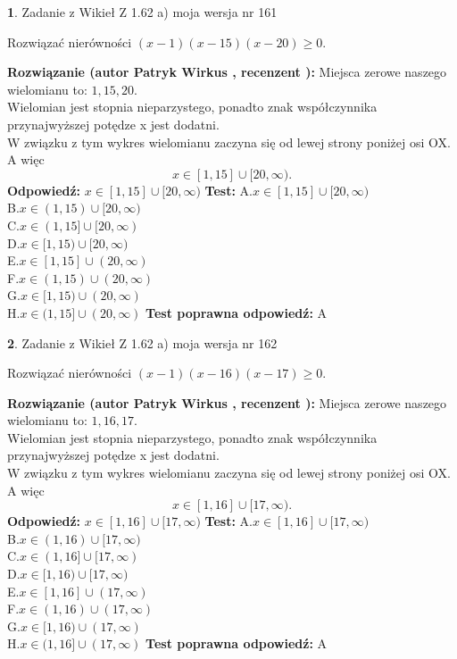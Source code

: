 \documentclass[12pt, a4paper]{article}
\theoremstyle{definition} %
\newtheorem{zad}{}
\newcommand{\zadStart}[1]{\begin{zad}#1\newline}
\newcommand{\zadStop}{\end{zad}}
\newcommand{\rozwStart}[2]{\noindent \textbf{Rozwiązanie (autor #1 , recenzent #2): }\newline}
\newcommand{\rozwStop}{\newline}
\newcommand{\odpStart}{\noindent \textbf{Odpowiedź:}\newline}
\newcommand{\odpStop}{\newline}
\newcommand{\testStart}{\noindent \textbf{Test:}\newline}
\newcommand{\testStop}{\newline}
\newcommand{\kluczStart}{\noindent \textbf{Test poprawna odpowiedź:}\newline}
\newcommand{\kluczStop}{\newline}
\begin{document}
\zadStart{Zadanie z Wikieł Z 1.62 a) moja wersja nr 161}

Rozwiązać nierówności $(x-1)(x-15)(x-20)\ge0$.
\zadStop
\rozwStart{Patryk Wirkus}{}
Miejsca zerowe naszego wielomianu to: $1, 15, 20$.\\
Wielomian jest stopnia nieparzystego, ponadto znak współczynnika przy\linebreak najwyższej potędze x jest dodatni.\\ W związku z tym wykres wielomianu zaczyna się od lewej strony poniżej osi OX. A więc $$x \in [1,15] \cup [20,\infty).$$
\rozwStop
\odpStart
$x \in [1,15] \cup [20,\infty)$
\odpStop
\testStart
A.$x \in [1,15] \cup [20,\infty)$\\
B.$x \in (1,15) \cup [20,\infty)$\\
C.$x \in (1,15] \cup [20,\infty)$\\
D.$x \in [1,15) \cup [20,\infty)$\\
E.$x \in [1,15] \cup (20,\infty)$\\
F.$x \in (1,15) \cup (20,\infty)$\\
G.$x \in [1,15) \cup (20,\infty)$\\
H.$x \in (1,15] \cup (20,\infty)$
\testStop
\kluczStart
A
\kluczStop



\zadStart{Zadanie z Wikieł Z 1.62 a) moja wersja nr 162}

Rozwiązać nierówności $(x-1)(x-16)(x-17)\ge0$.
\zadStop
\rozwStart{Patryk Wirkus}{}
Miejsca zerowe naszego wielomianu to: $1, 16, 17$.\\
Wielomian jest stopnia nieparzystego, ponadto znak współczynnika przy\linebreak najwyższej potędze x jest dodatni.\\ W związku z tym wykres wielomianu zaczyna się od lewej strony poniżej osi OX. A więc $$x \in [1,16] \cup [17,\infty).$$
\rozwStop
\odpStart
$x \in [1,16] \cup [17,\infty)$
\odpStop
\testStart
A.$x \in [1,16] \cup [17,\infty)$\\
B.$x \in (1,16) \cup [17,\infty)$\\
C.$x \in (1,16] \cup [17,\infty)$\\
D.$x \in [1,16) \cup [17,\infty)$\\
E.$x \in [1,16] \cup (17,\infty)$\\
F.$x \in (1,16) \cup (17,\infty)$\\
G.$x \in [1,16) \cup (17,\infty)$\\
H.$x \in (1,16] \cup (17,\infty)$
\testStop
\kluczStart
A
\kluczStop
\end{document}
